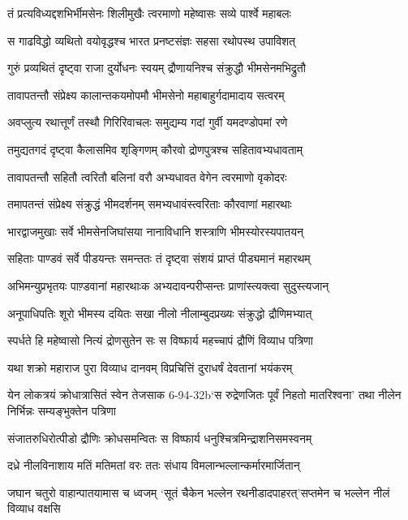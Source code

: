 \twolineshloka
{तं प्रत्यविध्यद्दशभिर्भीमसेनः शिलीमुखैः}
{त्वरमाणो महेष्वासः सव्ये पार्श्वे महाबलः}


\twolineshloka
{स गाढविद्धो व्यथितो वयोवृद्धश्च भारत}
{प्रनष्टसंज्ञः सहसा रथोपस्थ उपाविशत्}


\twolineshloka
{गुरुं प्रव्यथितं दृष्ट्वा राजा दुर्योधनः स्वयम्}
{द्रौणायनिश्च संक्रुद्धौ भीमसेनमभिद्रुतौ}


\twolineshloka
{तावापतन्तौ संप्रेक्ष्य कालान्तकयमोपमौ}
{भीमसेनो महाबाहुर्गदामादाय सत्वरम्}


\threelineshloka
{अवप्लुत्य रथात्तूर्णं तस्थौ गिरिरिवाचलः}
{समुद्यम्य गदां गुर्वी यमदण्डोपमां रणे}
{}


\twolineshloka
{तमुद्यतगदं दृष्ट्वा कैलासमिव शृङ्गिणम्}
{कौरवो द्रोणपुत्रश्च सहितावभ्यधावताम्}


\twolineshloka
{तावापतन्तौ सहितौ त्वरितौ बलिनां वरौ}
{अभ्यधावत वेगेन त्वरमाणो वृकोदरः}


\twolineshloka
{तमापतन्तं संप्रेक्ष्य संक्रुद्धं भीमदर्शनम्}
{समभ्यधावंस्त्वरिताः कौरवाणां महारथाः}


\twolineshloka
{भारद्वाजमुखाः सर्वे भीमसेनजिघांसया}
{नानाविधानि शस्त्राणि भीमस्योरस्यपातयन्}


\twolineshloka
{सहिताः पाण्डवं सर्वे पीडयन्तः समन्ततः}
{तं दृष्ट्वा संशयं प्राप्तं पीड्यमानं महारथम्}


\twolineshloka
{अभिमन्युप्रभृतयः पाण़्डवानां महारथाःक}
{अभ्यदावन्परीप्सन्तः प्राणांस्त्यक्त्वा सुदुस्त्यजान्}


\twolineshloka
{अनूपाधिपतिः शूरो भीमस्य दयितः सखा}
{नीलो नीलाम्बुदप्रख्यः संक्रुद्धो द्रौणिमभ्यात्}


\twolineshloka
{स्पर्धते हि महेष्वासो नित्यं द्रोणसुतेन सः}
{स विष्फार्य महच्चापं द्रौणिं विव्याध पत्रिणा}


\twolineshloka
{यथा शक्रो महाराज पुरा विव्याध दानवम्}
{विप्रचित्तिं दुराधर्षं देवतानां भयंकरम्}


\twolineshloka
{येन लोकत्रयं क्रोधात्रासितं स्वेन तेजसाक}
{6-94-32b`स रुद्रेणजितः पूर्वं निहतो मातरिश्वना' तथा नीलेन निर्भिन्नः सम्यङ्भुक्तेन पत्रिणा}


\twolineshloka
{संजातरुधिरोत्पीडो द्रौणिः क्रोधसमन्वितः}
{स विष्फार्य धनुश्चित्रमिन्द्राशनिसमस्वनम्}


\twolineshloka
{दध्रे नीलविनाशाय मतिं मतिमतां वरः}
{ततः संधाय विमलान्भल्लान्कर्मारमार्जितान्}


\twolineshloka
{जघान चतुरो वाहान्पातयामास च ध्वजम्}
{`सूतं चैकेन भल्लेन रथनीडादपाहरत्'सप्तमेन च भल्लेन नीलं विव्याध वक्षसि}


